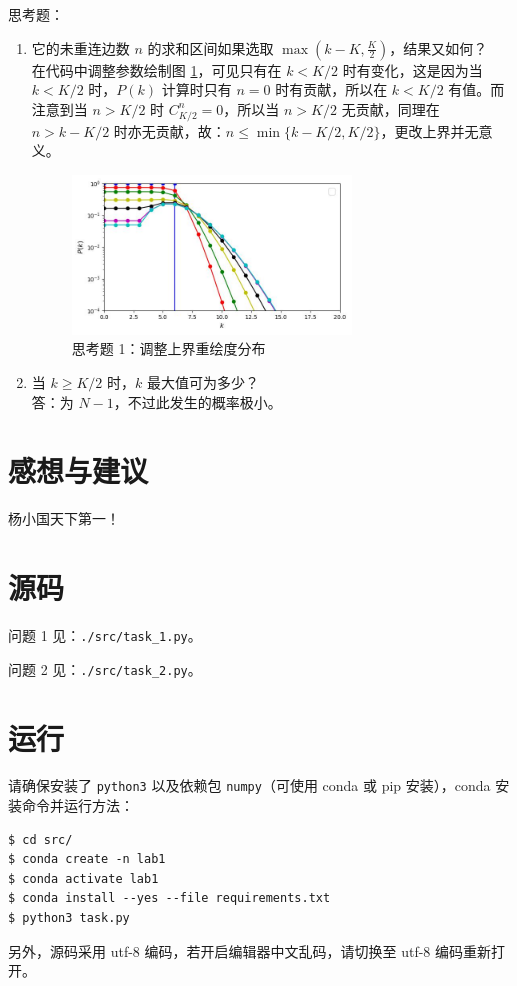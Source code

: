 \documentclass{article}
\begin{document}
思考题：
\begin{enumerate}
    \item 它的未重连边数 $n$ 的求和区间如果选取 $\max(k-K,\frac{K}{2})$，结果又如何？\\
    在代码中调整参数绘制图 \ref{fig:task2_fake}，可见只有在 $k<K/2$ 时有变化，这是因为当 $k<K/2$ 时，$P(k)$ 计算时只有 $n=0$ 时有贡献，所以在 $k<K/2$ 有值。而注意到当 $n>K/2$ 时 $C_{K/2}^{n}=0$，所以当 $n>K/2$ 无贡献，同理在 $n>k-K/2$ 时亦无贡献，故：$n\leq\min\{k-K/2,K/2\}$，更改上界并无意义。
    \begin{figure}[ht]
        \label{fig:task2_fake}
        \centering
        \includegraphics[width=0.7\textwidth]{../task2_fake.jpg}
        \caption{思考题 1：调整上界重绘度分布}
    \end{figure}
    \item 当 $k\geq K/2$ 时，$k$ 最大值可为多少？\\
    答：为 $N-1$，不过此发生的概率极小。
\end{enumerate}

\newpage

\section{感想与建议}

杨小国天下第一！

\section{源码}

问题 1 见：\lstinline{./src/task_1.py}。

问题 2 见：\lstinline{./src/task_2.py}。

\section{运行}

请确保安装了 \lstinline{python3} 以及依赖包 \lstinline{numpy}（可使用 conda 或 pip 安装），conda 安装命令并运行方法：
\begin{lstlisting}
$ cd src/
$ conda create -n lab1
$ conda activate lab1
$ conda install --yes --file requirements.txt
$ python3 task.py
\end{lstlisting}

另外，源码采用 utf-8 编码，若开启编辑器中文乱码，请切换至 utf-8 编码重新打开。
\end{document}

